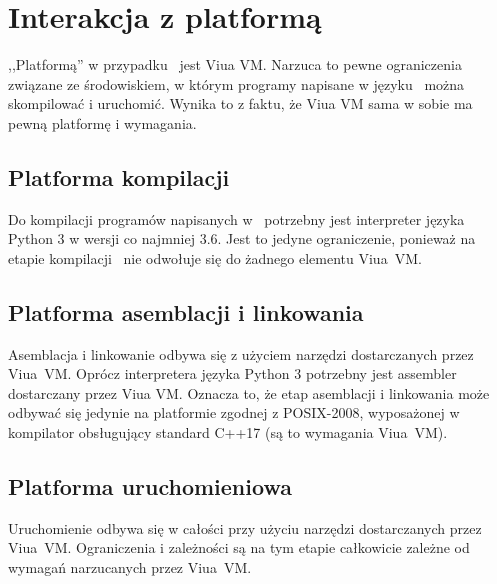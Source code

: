 

\section{Interakcja z platformą}

,,Platformą'' w przypadku \ViuAct\ jest Viua VM. Narzuca to pewne ograniczenia
związane ze środowiskiem, w którym programy napisane w języku \ViuAct\ można
skompilować i uruchomić. Wynika to z faktu, że Viua VM sama w sobie ma pewną
platformę i wymagania.

\subsection{Platforma kompilacji}

Do kompilacji programów napisanych w \ViuAct\ potrzebny jest interpreter języka
Python 3 w wersji co najmniej 3.6. Jest to jedyne ograniczenie, ponieważ na
etapie kompilacji \ViuAct\ nie odwołuje się do żadnego elementu Viua~VM.

\subsection{Platforma asemblacji i linkowania}

Asemblacja i linkowanie odbywa się z użyciem narzędzi dostarczanych przez
Viua~VM. Oprócz interpretera języka Python 3 potrzebny jest assembler
dostarczany przez Viua VM. Oznacza to, że etap asemblacji i linkowania może
odbywać się jedynie na platformie zgodnej z POSIX-2008, wyposażonej w kompilator
obsługujący standard C++17 (są to wymagania Viua~VM).

\subsection{Platforma uruchomieniowa}

Uruchomienie odbywa się w całości przy użyciu narzędzi dostarczanych przez
Viua~VM. Ograniczenia i zależności są na tym etapie całkowicie zależne od
wymagań narzucanych przez Viua~VM.
